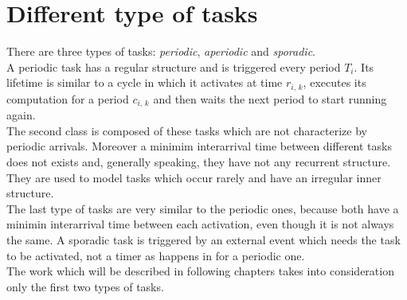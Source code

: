 \section{Different type of tasks}
There are three types of tasks: \emph{periodic}, \emph{aperiodic} and \emph{sporadic}.\\
A periodic task has a regular structure and is triggered every period \( T_{i} \). Its lifetime is similar to a cycle in which it activates at time \( r_{i,\,k} \), executes its computation for a period \( c_{i,\,k} \) and then waits the next period to start running again.\\
The second class is composed of these tasks which are not characterize by periodic arrivals. Moreover a minimim interarrival time between different tasks does not exists and, generally speaking, they have not any recurrent structure. They are used to model tasks which occur rarely and have an irregular inner structure.\\
The last type of tasks are very similar to the periodic ones, because both have a minimin interarrival time between each activation, even though it is not always the same. A sporadic task is triggered by an external event which needs the task to be activated, not a timer as happens in for a periodic one.\\
The work which will be described in following chapters takes into consideration only the first two types of tasks.

